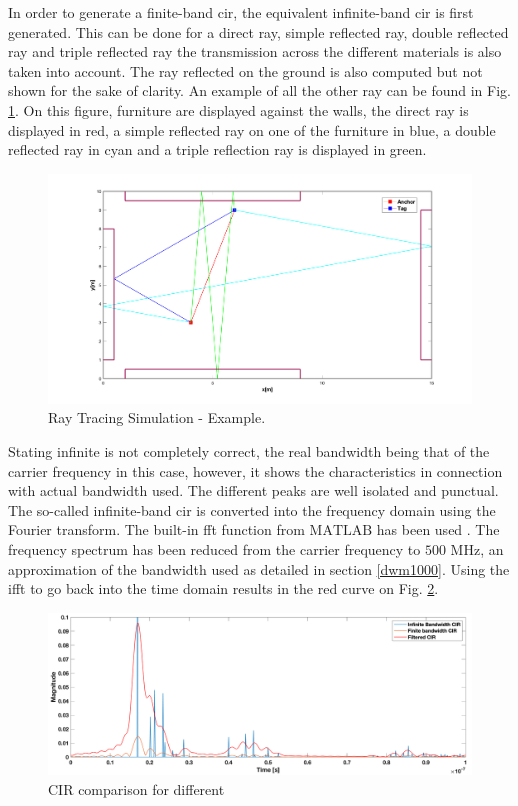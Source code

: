 In order to generate a finite-band \gls{cir}, the equivalent infinite-band \gls{cir} is first generated. This can be done for a direct ray, simple reflected ray, double reflected ray and triple reflected ray the transmission across the different materials is also taken into account. The ray reflected on the ground is also computed but not shown for the sake of clarity. An example of all the other ray can be found in Fig. \ref{fig:ray_simu}. On this figure, furniture are displayed against the walls, the direct ray is displayed in red, a simple reflected ray on one of the furniture in blue, a double reflected ray in cyan and a triple reflection ray is displayed in green.

\begin{figure}[H]
\centering
\includegraphics[width=.75\linewidth]{Images/rays_example.png}
\caption{Ray Tracing Simulation - Example. \label{fig:ray_simu}}
\end{figure}

Stating infinite is not completely correct, the real bandwidth being that of the carrier frequency in this case, however, it shows the characteristics in connection with actual bandwidth used. The different peaks are well isolated and punctual. The so-called infinite-band \gls{cir} is converted into the frequency domain using the Fourier transform. The built-in \gls{fft} function from $\text{MATLAB}$ has been used \cite{mathworks}. The frequency spectrum has been reduced from the carrier frequency to $\text{500 MHz}$, an approximation of the bandwidth used as detailed in section \ref{dwm1000}. Using the \gls{ifft} to go back into the time domain results in the red curve on Fig. \ref{fig:conv_fin}.

\begin{figure}[H]
\centering
\includegraphics[width=.9\linewidth]{Images/cir.png}
\caption{CIR comparison for different \label{fig:conv_fin}}
\end{figure}

